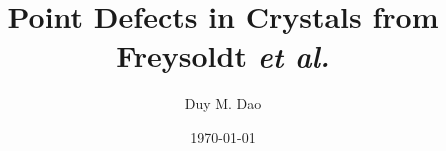 \documentclass[11pt]{article}      %
\title{Point Defects in Crystals from Freysoldt \textit{et al.}}
\author{Duy M. Dao}
\date{\today}                      %
\numberwithin{equation}{section}   %
\begin{document}
\maketitle                         %

\newenvironment{parts}
  {\begin{enumerate}\renewcommand{\theenumi}{\alph{enumi}}\renewcommand{\labelenumi}{(\theenumi)}}
  {\end{enumerate}}




\end{document}
